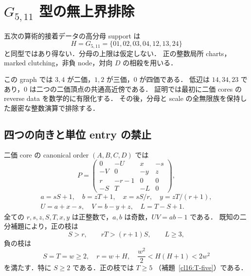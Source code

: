 \section{\texorpdfstring{$G_{5,11}$}{G5,11} 型の無上界排除}
\label{g51120:section}

\begin{theorem}[二つの三価頂点を持つ七高辺型の障害]
\label{g51120:no-support}
五次の算術的接着データの高分母 support は
\[
 H=G_{5,11}=\{01,02,03,04,12,13,24\}
\]
と同型ではあり得ない．分母の上限は仮定しない．
正の整数局所 charts，marked clutching，非負 node，対向 $D$ の相殺を用いる．
\end{theorem}

この graph では $3,4$ が二価，$1,2$ が三価，$0$ が四価である．
低辺は $14,34,23$ であり，$0$ は二つの二価頂点の共通高近傍である．
証明では最初に二価 cores の reverse data を数学的に有限化する．
その後，分母と scale の全無限族を保持した厳密な整数演算で排除する．

\subsection{四つの向きと単位 entry の禁止}

二価 core の canonical order $(A,B,C,D)$ では
\begin{equation}\label{g51120:canonical}
 P=\begin{pmatrix}
 0&-U&x&-s\\
 -V&0&-y&z\\
 r&-r-1&0&0\\
 -S&T&-L&0
 \end{pmatrix},
\end{equation}
\[
 \begin{gathered}
 a=sS+1,\quad b=zT+1,\quad x=sS/r,\quad y=zT/(r+1),
 \\
 U=a+x-s,\quad V=b-y+z,\quad L=T-S+1.
 \end{gathered}
\]
全ての $r,s,z,S,T,x,y$ は正整数で，$a,b$ は奇数，$UV=ab-1$ である．
既知の二分補題により，正の枝は
\begin{equation}\label{g51120:positive}
 S>r,\qquad rT>(r+1)S,\qquad L\ge3,
\end{equation}
負の枝は
\begin{equation}\label{g51120:negative}
 S=T=w\ge2,\quad r=w+H,\quad
 \frac{w^2}{2}<H(H+1)<2w^2
\end{equation}
を満たす．特に $S\ge2$ である．正の枝では $T\ge5$
（補題~\ref{cl16:T-five}）である．

